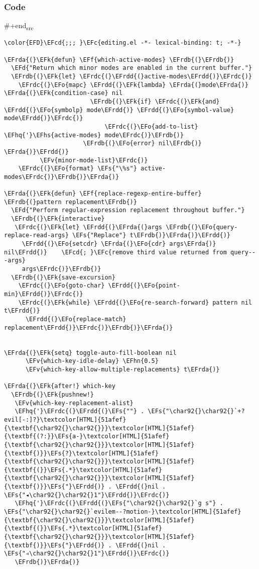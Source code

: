 \documentclass[a4wide,10pt]{article}
\newcommand{\EFc}[1]{\textcolor{EFc}{#1}} %
\newcommand{\EFcd}[1]{\textcolor{EFcd}{#1}} %
\newcommand{\EFs}[1]{\textcolor{EFs}{#1}} %
\newcommand{\EFd}[1]{\textcolor{EFd}{#1}} %
\newcommand{\EFk}[1]{\textcolor{EFk}{#1}} %
\newcommand{\EFf}[1]{\textcolor{EFf}{#1}} %
\newcommand{\EFv}[1]{\textcolor{EFv}{#1}} %
\newcommand{\EFo}[1]{\textcolor{EFo}{#1}} %
\newcommand{\EFhn}[1]{\textcolor{EFhn}{\textbf{#1}}} %
\newcommand{\EFhq}[1]{\textcolor{EFhq}{#1}} %
\newcommand{\EFhs}[1]{\textcolor{EFhs}{#1}} %
\newcommand{\EFrda}[1]{\textcolor{EFrda}{#1}} %
\newcommand{\EFrdb}[1]{\textcolor{EFrdb}{#1}} %
\newcommand{\EFrdc}[1]{\textcolor{EFrdc}{#1}} %
\newcommand{\EFrdd}[1]{\textcolor{EFrdd}{#1}} %
\begin{document}
\subsubsection{Code}
\label{sec:org78eef7f}
\#+end\textsubscript{src}
\begin{Code}
\begin{Verbatim}
\color{EFD}\EFcd{;;; }\EFc{editing.el -*- lexical-binding: t; -*-}

\EFrda{(}\EFk{defun} \EFf{which-active-modes} \EFrdb{(}\EFrdb{)}
  \EFd{"Return which minor modes are enabled in the current buffer."}
  \EFrdb{(}\EFk{let} \EFrdc{(}\EFrdd{(}active-modes\EFrdd{)}\EFrdc{)}
    \EFrdc{(}\EFo{mapc} \EFrdd{(}\EFk{lambda} \EFrda{(}mode\EFrda{)} \EFrda{(}\EFk{condition-case} nil
                        \EFrdb{(}\EFk{if} \EFrdc{(}\EFk{and} \EFrdd{(}\EFo{symbolp} mode\EFrdd{)} \EFrdd{(}\EFo{symbol-value} mode\EFrdd{)}\EFrdc{)}
                            \EFrdc{(}\EFo{add-to-list} \EFhq{'}\EFhs{active-modes} mode\EFrdc{)}\EFrdb{)}
                      \EFrdb{(}\EFo{error} nil\EFrdb{)} \EFrda{)}\EFrdd{)}
          \EFv{minor-mode-list}\EFrdc{)}
    \EFrdc{(}\EFo{format} \EFs{"\%s"} active-modes\EFrdc{)}\EFrdb{)}\EFrda{)}

\EFrda{(}\EFk{defun} \EFf{replace-regexp-entire-buffer} \EFrdb{(}pattern replacement\EFrdb{)}
  \EFd{"Perform regular-expression replacement throughout buffer."}
  \EFrdb{(}\EFk{interactive}
   \EFrdc{(}\EFk{let} \EFrdd{(}\EFrda{(}args \EFrdb{(}\EFo{query-replace-read-args} \EFs{"Replace"} t\EFrdb{)}\EFrda{)}\EFrdd{)}
     \EFrdd{(}\EFo{setcdr} \EFrda{(}\EFo{cdr} args\EFrda{)} nil\EFrdd{)}    \EFcd{; }\EFc{remove third value returned from query---args}
     args\EFrdc{)}\EFrdb{)}
  \EFrdb{(}\EFk{save-excursion}
    \EFrdc{(}\EFo{goto-char} \EFrdd{(}\EFo{point-min}\EFrdd{)}\EFrdc{)}
    \EFrdc{(}\EFk{while} \EFrdd{(}\EFo{re-search-forward} pattern nil t\EFrdd{)}
      \EFrdd{(}\EFo{replace-match} replacement\EFrdd{)}\EFrdc{)}\EFrdb{)}\EFrda{)}


\EFrda{(}\EFk{setq} toggle-auto-fill-boolean nil
      \EFv{which-key-idle-delay} \EFhn{0.5}
      \EFv{which-key-allow-multiple-replacements} t\EFrda{)}

\EFrda{(}\EFk{after!} which-key
  \EFrdb{(}\EFk{pushnew!}
   \EFv{which-key-replacement-alist}
   \EFhq{'}\EFrdc{(}\EFrdd{(}\EFs{""} . \EFs{"\char92{}\char92{}`+?evil[-:]?}\textcolor[HTML]{51afef}{\textbf{\char92{}\char92{}}}\textcolor[HTML]{51afef}{\textbf{(?:}}\EFs{a-}\textcolor[HTML]{51afef}{\textbf{\char92{}\char92{}}}\textcolor[HTML]{51afef}{\textbf{)}}\EFs{?}\textcolor[HTML]{51afef}{\textbf{\char92{}\char92{}}}\textcolor[HTML]{51afef}{\textbf{(}}\EFs{.*}\textcolor[HTML]{51afef}{\textbf{\char92{}\char92{}}}\textcolor[HTML]{51afef}{\textbf{)}}\EFs{"}\EFrdd{)} . \EFrdd{(}nil . \EFs{"◂\char92{}\char92{}1"}\EFrdd{)}\EFrdc{)}
   \EFhq{'}\EFrdc{(}\EFrdd{(}\EFs{"\char92{}\char92{}`g s"} . \EFs{"\char92{}\char92{}`evilem--?motion-}\textcolor[HTML]{51afef}{\textbf{\char92{}\char92{}}}\textcolor[HTML]{51afef}{\textbf{(}}\EFs{.*}\textcolor[HTML]{51afef}{\textbf{\char92{}\char92{}}}\textcolor[HTML]{51afef}{\textbf{)}}\EFs{"}\EFrdd{)} . \EFrdd{(}nil . \EFs{"◃\char92{}\char92{}1"}\EFrdd{)}\EFrdc{)}
   \EFrdb{)}\EFrda{)}


\end{Verbatim}
\end{Code}
\end{document}
